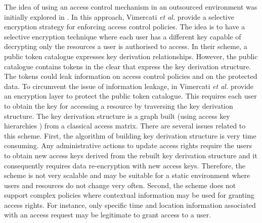 \documentclass[final,5p,times,twocolumn]{elsarticle}
\begin{document}
The idea of using an access control mechanism in an outsourced environment was initially explored in \cite{Vimercati2007-2, Vimercati2007}. In this approach, Vimercati \emph{et al.} provide a selective encryption strategy for enforcing access control policies. The idea is to have a selective encryption technique where each user has a different key capable of decrypting only the resources a user is authorised to access. In their scheme, a public token catalogue expresses key derivation relationships. However, the public catalogue contains tokens in the clear that express the key derivation structure. The tokens could leak information on access control policies and on the protected data. To circumvent the issue of information leakage, in \cite{Vimercati2008} Vimercati \emph{et al.} provide an encryption layer to protect the public token catalogue. This requires each user to obtain the key for accessing a resource by traversing the key derivation structure. The key derivation structure is a graph built (using access key hierarchies \cite{Atallah2009}) from a classical access matrix. There are several issues related to this scheme. First, the algorithm of building key derivation structure is very time consuming. Any administrative actions to update access rights require the users to obtain new access keys derived from the rebuilt key derivation structure and it consequently requires data re-encryption with new access keys. Therefore, the scheme is not very scalable and may be suitable for a static environment where users and resources do not change very often. Second, the scheme does not support complex policies where contextual information may be used for granting access rights. For instance, only specific time and location information associated with an access request may be legitimate to grant access to a user.
\end{document}
